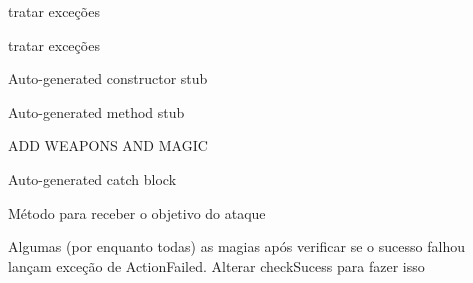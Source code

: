 \begin{DoxyRefList}
%
tratar exceções  
\item[Membro \mbox{\hyperlink{classbr_1_1unicamp_1_1mc322_1_1projeto_1_1heroquest_1_1entity_1_1_wall_a1141ab0c230bba2edde720c061222127}{br.unicamp.mc322.projeto.heroquest.entity.Wall.draw}} ()]\label{todo__todo000052}%
%
tratar exceções  
\item[Membro \mbox{\hyperlink{classbr_1_1unicamp_1_1mc322_1_1projeto_1_1heroquest_1_1entity_1_1_wall_acff8e2f0c965527e7ae5f7637758108e}{br.unicamp.mc322.projeto.heroquest.entity.Wall.Wall}} (Pose pose)]\label{todo__todo000051}%
%
Auto-\/generated constructor stub  
\item[Membro \mbox{\hyperlink{classbr_1_1unicamp_1_1mc322_1_1projeto_1_1heroquest_1_1entity_1_1_wizard_a9eaf1b2fc0eff4b97e9d4c4d25f0c97e}{br.unicamp.mc322.projeto.heroquest.entity.Wizard.draw}} ()]\label{todo__todo000054}%
%
Auto-\/generated method stub  
\item[Membro \mbox{\hyperlink{classbr_1_1unicamp_1_1mc322_1_1projeto_1_1heroquest_1_1entity_1_1_wizard_a85b398b79e58d2cdd124bed43d62835f}{br.unicamp.mc322.projeto.heroquest.entity.Wizard.Wizard}} (Pose pose)]\label{todo__todo000053}%
%
A\+DD W\+E\+A\+P\+O\+NS A\+ND M\+A\+G\+IC  
\item[Membro \mbox{\hyperlink{classbr_1_1unicamp_1_1mc322_1_1projeto_1_1heroquest_1_1_hero_quest_game_a99cfe10a9281cc8b211abfd7d31d1aea}{br.unicamp.mc322.projeto.heroquest.Hero\+Quest\+Game.Hero\+Quest\+Game}} ()]\label{todo__todo000055}%
%
Auto-\/generated catch block  
\item[Membro \mbox{\hyperlink{classbr_1_1unicamp_1_1mc322_1_1projeto_1_1heroquest_1_1magic_1_1_fireball_affc9a5c597a53e4510e23206fb064107}{br.unicamp.mc322.projeto.heroquest.magic.Fireball.attack}} (Attacker origin)]\label{todo__todo000056}%
%
Método para receber o objetivo do ataque  
\item[Classe \mbox{\hyperlink{classbr_1_1unicamp_1_1mc322_1_1projeto_1_1heroquest_1_1magic_1_1_magic}{br.unicamp.mc322.projeto.heroquest.magic.Magic}} ]\label{todo__todo000057}%
%
Algumas (por enquanto todas) as magias após verificar se o sucesso falhou lançam exceção de Action\+Failed. Alterar check\+Sucess para fazer isso  
\item[Membro \mbox{\hyperlink{classbr_1_1unicamp_1_1mc322_1_1projeto_1_1heroquest_1_1magic_1_1_magic_af94fdb3aa84155599af04d8153807653}{br.unicamp.mc322.projeto.heroquest.magic.Magic.check\+Sucess}} (Caster caster)]\label{todo__todo000058}%

\end{DoxyRefList}
